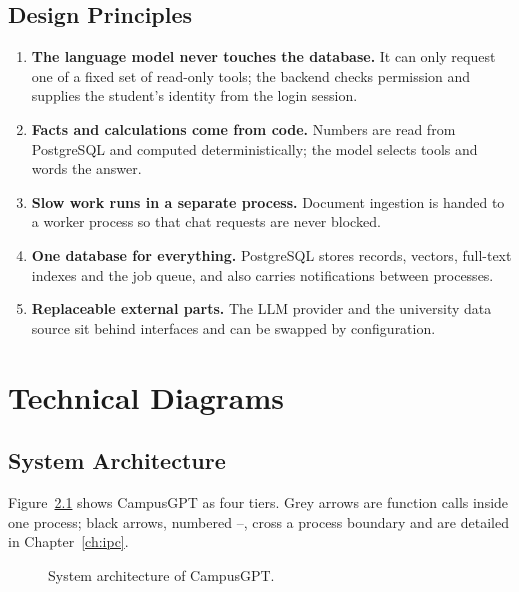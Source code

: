 \documentclass[11pt,a4paper,oneside]{report}
\begin{document}
\section{Design Principles}
\begin{enumerate}[itemsep=1pt]
  \item \textbf{The language model never touches the database.} It can only request one of
        a fixed set of read-only tools; the backend checks permission and supplies the
        student's identity from the login session.
  \item \textbf{Facts and calculations come from code.} Numbers are read from PostgreSQL and
        computed deterministically; the model selects tools and words the answer.
  \item \textbf{Slow work runs in a separate process.} Document ingestion is handed to a
        worker process so that chat requests are never blocked.
  \item \textbf{One database for everything.} PostgreSQL stores records, vectors, full-text
        indexes and the job queue, and also carries notifications between processes.
  \item \textbf{Replaceable external parts.} The LLM provider and the university data
        source sit behind interfaces and can be swapped by configuration.
\end{enumerate}

\chapter{Technical Diagrams}

\section{System Architecture}
Figure~\ref{fig:arch} shows CampusGPT as four tiers. Grey arrows are function calls inside
one process; black arrows, numbered --, cross a process boundary and
are detailed in Chapter~\ref{ch:ipc}.

\begin{figure}[H]
\centering
\resizebox{\textwidth}{!}{}
\caption{System architecture of CampusGPT.}
\label{fig:arch}
\end{figure}
\end{document}
